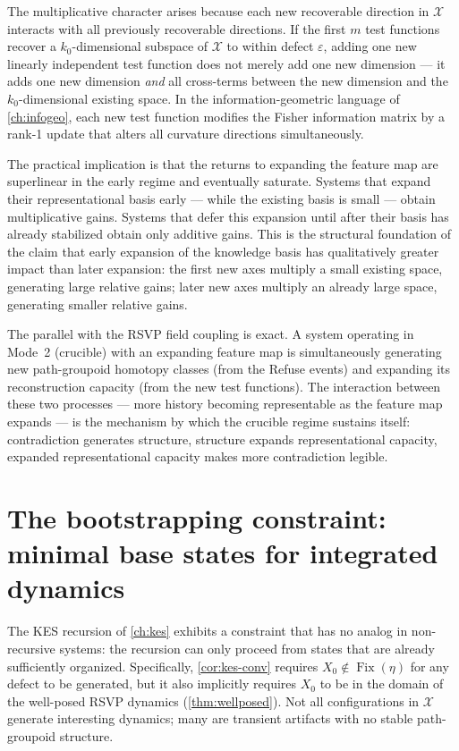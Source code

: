 \documentclass[12pt, oneside]{memoir}
\DeclareMathOperator{\Fix}{Fix}
\newcommand{\X}{\mathcal{X}}
\begin{document}
The multiplicative character arises because each new recoverable direction in $\X$
interacts with all previously recoverable directions.  If the first $m$ test functions
recover a $k_0$-dimensional subspace of $\X$ to within defect $\varepsilon$, adding one
new linearly independent test function does not merely add one new dimension — it adds
one new dimension \emph{and} all cross-terms between the new dimension and the
$k_0$-dimensional existing space.  In the information-geometric language of
\cref{ch:infogeo}, each new test function modifies the Fisher information matrix by a
rank-1 update that alters all curvature directions simultaneously.

The practical implication is that the returns to expanding the feature map are
superlinear in the early regime and eventually saturate.  Systems that expand their
representational basis early — while the existing basis is small — obtain multiplicative
gains.  Systems that defer this expansion until after their basis has already stabilized
obtain only additive gains.  This is the structural foundation of the claim that early
expansion of the knowledge basis has qualitatively greater impact than later expansion:
the first new axes multiply a small existing space, generating large relative gains;
later new axes multiply an already large space, generating smaller relative gains.

The parallel with the RSVP field coupling is exact.  A system operating in Mode~2
(crucible) with an expanding feature map is simultaneously generating new path-groupoid
homotopy classes (from the Refuse events) and expanding its reconstruction capacity (from
the new test functions).  The interaction between these two processes — more history
becoming representable as the feature map expands — is the mechanism by which the
crucible regime sustains itself: contradiction generates structure, structure expands
representational capacity, expanded representational capacity makes more contradiction
legible.

\section{The bootstrapping constraint: minimal base states for integrated dynamics}
\label{sec:bootstrapping}

The KES recursion of \cref{ch:kes} exhibits a constraint that has no analog in
non-recursive systems: the recursion can only proceed from states that are already
sufficiently organized.  Specifically, \cref{cor:kes-conv} requires $X_0 \notin
\Fix(\eta)$ for any defect to be generated, but it also implicitly requires $X_0$ to be
in the domain of the well-posed RSVP dynamics (\cref{thm:wellposed}).  Not all
configurations in $\X$ generate interesting dynamics; many are transient artifacts with
no stable path-groupoid structure.
\end{document}
